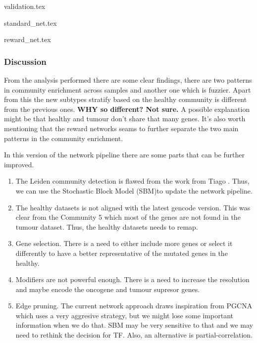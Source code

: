{validation.tex}

{standard_net.tex}

{reward_net.tex}


\newpage

\subsubsection{Discussion}






From the analysis performed there are some clear findings, there are two patterns in community enrichment across samples and another one which is fuzzier. Apart from this the new subtypes stratify based on the healthy community is different from the previous ones. \textbf{WHY so different? Not sure.} A possible explanation might be that healthy and tumour don't share that many genes. It's also worth mentioning that the reward networks seams to further separate the two main patterns in the community enrichment.

In this version of the network pipeline there are some parts that can be further improved.
\begin{enumerate}
    \item The Leiden community detection is flawed from the work from Tiago \cite{Peixoto2021-jx,Fortunato2016-tj}. Thus, we can use the Stochastic Block Model (SBM)\cite{Peixoto2017-ua}to update the network pipeline.
    \item The healthy datasets is not aligned with the latest gencode version. This was clear from the Community 5 which most of the genes are not found in the tumour dataset. Thus, the healthy datasets needs to remap.
    \item Gene selection. There is a need to either include more genes or select it differently to have a better representative of the mutated genes in the healthy.
    \item Modifiers are not powerful enough. There is a need to increase the resolution and maybe encode the oncogene and tumour supresor genes.
    \item Edge pruning. The current network approach draws inspiration from PGCNA which uses a very aggresive strategy, but we might lose some important information when we do that. SBM may be very sensitive to that and we may need to rethink the decision for TF. Also, an alternative is partial-correlation.
\end{enumerate}


